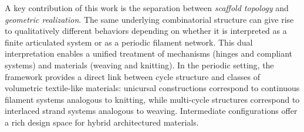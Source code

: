 \documentclass[acmtog,anonymous,review]{acmart}
\begin{document}
A key contribution of this work is the separation between \emph{scaffold topology} and \emph{geometric realization}. The same underlying combinatorial structure can give rise to qualitatively different behaviors depending on whether it is interpreted as a finite articulated system or as a periodic filament network. This dual interpretation enables a unified treatment of mechanisms (hinges and compliant systems) and materials (weaving and knitting). In the periodic setting, the framework provides a direct link between cycle structure and classes of volumetric textile-like materials: unicursal constructions correspond to continuous filament systems analogous to knitting, while multi-cycle structures correspond to interlaced strand systems analogous to weaving. Intermediate configurations offer a rich design space for hybrid architectured materials.
\end{document}

